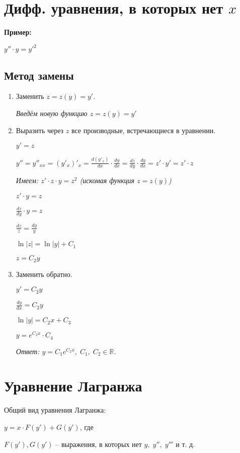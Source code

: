 \documentclass[10pt, a4paper]{article}
\begin{document}
\section{Дифф. уравнения, в которых нет $x$}
\textbf{Пример:}
\par $y'' \cdot y = y'^{2}$
\subsection{Метод замены}
\begin{enumerate}
    \item Заменить $z = z(y) = y'$.
        \par\textit{Введём новую функцию $z = z(y) = y'$}
    \item Выразить через $z$ все производные, встречающиеся в уравнении.
        \par $y' = z$
        \par $y'' = y''_{xx} = (y'_{x})'_{x} = \frac{d(y'_{x})}{dx}  \cdot  \frac{dy}{dx} = \frac{dz}{dy}  \cdot  \frac{dy}{dx} = z' \cdot y' = z' \cdot z$
        \par\textit{Имеем: $z' \cdot z \cdot y = z^2$ (искомая функция $z = z(y)$)}
        \par $z' \cdot y = z$
        \par $\frac{dz}{dy} \cdot y = z$
        \par $\frac{dz}{z} = \frac{dy}{y}$
        \par $\ln|z| = \ln|y| + C_{1}$
        \par $z = C_{2}y$
    \item Заменить обратно.
        \par $y' = C_{2}y$
        \par $\frac{dy}{dx} = C_{2}y$
        \par $\ln|y| = C_{2}x + C_{3}$
        \par $y = e^{C_2{x}}  \cdot  C_4$
        \par\textit{Ответ: $y = C_1e^{C_2x}, \; C_1, \; C_2 \in \mathbb{R}$.}
\end{enumerate}


\section{Уравнение Лагранжа}
Общий вид уравнения Лагранжа:
\par $y = x \cdot F(y') + G(y')$, где
\par $F(y'), G(y')$ -- выражения, в которых нет $y, \; y'', \; y'''$ и т. д.
\end{document}
